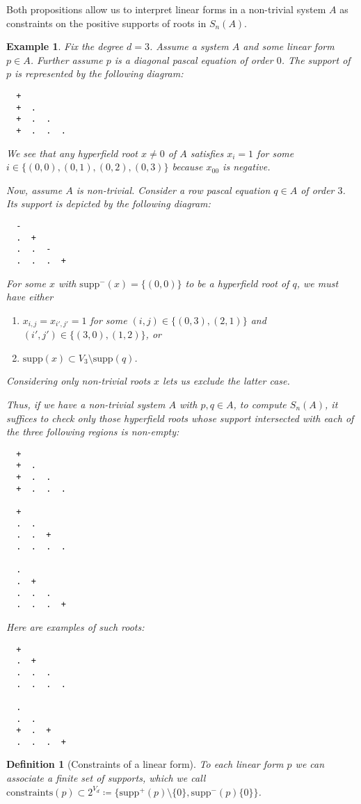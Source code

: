 \documentclass[11pt]{article}
\newtheorem{definition}[theorem]{Definition}
\newtheorem{example}[theorem]{Example}
\begin{document}
Both propositions allow us to interpret linear forms in a non-trivial system $A$ as constraints on the positive supports of roots in $S_{n}(A)$.

\begin{example}
  Fix the degree $d = 3$.
  Assume a system $A$ and some linear form $p \in A$. Further assume $p$ is a diagonal pascal equation of order $0$. The support of $p$ is represented by the following diagram:
 \begin{verbatim}
  + 
  +  . 
  +  .  .
  +  .  .  .
 \end{verbatim} 
  We see that any hyperfield root $x \neq 0$ of $A$ satisfies $x_{i} = 1$ for some $i \in \{ (0,0), (0,1), (0,2), (0,3) \}$ because $x_{00}$ is negative.

  Now, assume $A$ is non-trivial. Consider a row pascal equation $q \in A$ of order $3$. Its support is depicted by the following diagram:
 \begin{verbatim}
  - 
  .  + 
  .  .  -
  .  .  .  +
 \end{verbatim} 
 For some $x$ with $\mathrm{supp}^-(x) = \{ (0,0) \}$ to be a hyperfield root of $q$, we must have either
 \begin{enumerate}
  \item $x_{i,j} = x_{i',j'} = 1$ for some $(i,j) \in \{ (0,3), (2, 1) \}$ and $(i',j') \in \{ (3,0), (1,2) \}$, or 
  \item $\mathrm{supp}(x) \subset V_{3} \setminus \mathrm{supp}(q)$.
 \end{enumerate}
 Considering only non-trivial roots $x$ lets us exclude the latter case.

 Thus, if we have a non-trivial system $A$ with $p,q \in A$, to compute $S_{n}(A)$, it suffices to check only those hyperfield roots whose support intersected with each of the three following regions is non-empty:
 \begin{verbatim}
  + 
  +  . 
  +  .  .
  +  .  .  .

  + 
  .  . 
  .  .  +
  .  .  .  .

  . 
  .  + 
  .  .  .
  .  .  .  + 
 \end{verbatim}
 Here are examples of such roots:
 \begin{verbatim}
  +               
  .  +           
  .  .  .
  .  .  .  .

  . 
  .  . 
  +  .  +
  .  .  .  +
 \end{verbatim}
\end{example}

\begin{definition}[Constraints of a linear form]
  To each linear form $p$ we can associate a finite set of supports, which we call $\mathrm{constraints}(p) \subset 2^{V_{d}} \coloneqq \{\mathrm{supp}^+(p) \setminus \{0\}, \mathrm{supp}^-(p) \{ 0 \} \}$. 

\end{definition}
\end{document}
